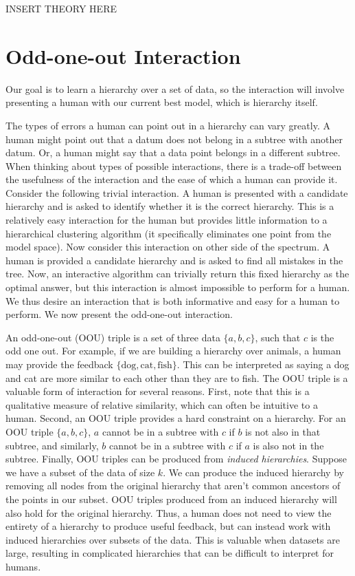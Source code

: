 \documentclass[12pt]{article}
\begin{document}
INSERT THEORY HERE

\section{Odd-one-out Interaction}

Our goal is to learn a hierarchy over a set of data, so the interaction
will involve presenting a human with our current best model, which is 
hierarchy itself.

The types of errors a human can point out in a hierarchy can vary greatly.
A human might point out that a datum does not belong in a subtree with another datum.
Or, a human might say that a data point belongs in a different subtree.
When thinking about types of possible interactions, there is a trade-off between
the usefulness of the interaction and the ease of which a human can provide it.
Consider the following trivial interaction. A human is presented with a candidate hierarchy and
is asked to identify whether it is the correct hierarchy. 
This is a relatively easy interaction
for the human but provides little information to a hierarchical clustering algorithm
(it specifically eliminates one point from the model space).
Now consider this interaction on other side of the spectrum. A human is provided a 
candidate hierarchy and is asked to find all mistakes in the tree.
Now, an interactive algorithm can trivially return this fixed hierarchy
as the optimal answer, but this interaction is almost impossible to perform for a human.
We thus desire an interaction that is both informative and easy for a human to perform.
We now present the odd-one-out interaction.

An odd-one-out (OOU) triple is a set of three data $\{a, b, c\}$, such that
$c$ is the odd one out. For example, if we are building a hierarchy over animals, a human
may provide the feedback $\{\text{dog}, \text{cat}, \text{fish}\}$. This can be interpreted
as saying a dog and cat are more similar to each other than they are to fish.
The OOU triple is a valuable form of interaction for several reasons.
First, note that this is a qualitative measure of relative similarity, which can often
be intuitive to a human. Second, an OOU triple provides a hard constraint on a hierarchy. 
For an OOU triple $\{a, b, c\}$, $a$ cannot be in a subtree with $c$ if $b$ is not also in that
subtree, and similarly, $b$ cannot be in a subtree with $c$ if $a$ is also not in the subtree.
Finally, OOU triples can be produced from \emph{induced hierarchies}. Suppose we have a subset
of the data of size $k$. We can produce the induced hierarchy by removing 
all nodes from the original hierarchy that aren't common ancestors of the points in our
subset. OOU triples produced from an induced hierarchy will also hold for the original hierarchy.
Thus, a human does not need to view the entirety of a hierarchy to produce useful feedback, but
can instead work with induced hierarchies over subsets of the data. This is valuable when
datasets are large, resulting in complicated hierarchies that can be difficult to interpret
for humans.
\end{document}
